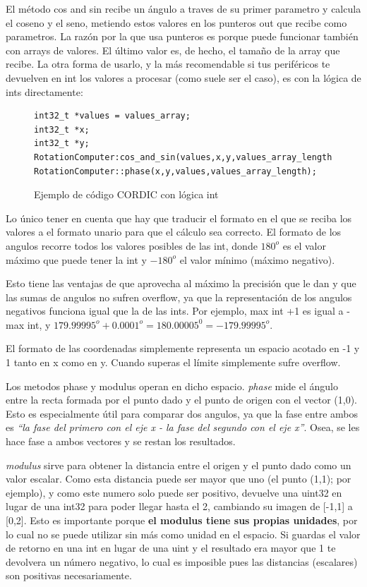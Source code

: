 \documentclass{report}
\begin{document}
\par \vspace{0.3cm}
El método cos and sin recibe un ángulo a traves de su primer parametro y calcula el coseno y el seno, metiendo estos valores en los punteros out que recibe como parametros. La razón por la que usa punteros es porque puede funcionar también con arrays de valores. El último valor es, de hecho, el tamaño de la array que recibe. La otra forma de usarlo, y la más recomendable si tus periféricos te devuelven en int los valores a procesar (como suele ser el caso), es con la lógica de ints directamente:
\begin{figure}[h]
\begin{lstlisting}
int32_t *values = values_array;
int32_t *x;
int32_t *y;
RotationComputer:cos_and_sin(values,x,y,values_array_length);
RotationComputer::phase(x,y,values,values_array_length);
\end{lstlisting}
\caption{Ejemplo de código CORDIC con lógica int}
  \label{CORDICwIntcode}
\end{figure}
\par \vspace{0.3cm}
Lo único tener en cuenta que hay que traducir el formato en el que se reciba los valores a el formato unario para que el cálculo sea correcto. El formato de los angulos recorre todos los valores posibles de las int, donde $180^o$ es el valor máximo que puede tener la int y $-180^o$ el valor mínimo (máximo negativo). \par
Esto tiene las ventajas de que aprovecha al máximo la precisión que le dan y que las sumas de angulos no sufren overflow, ya que la representación de los angulos negativos funciona igual que la de las ints. Por ejemplo, max int +1 es igual a -max int, y $179.99995^o + 0.0001^o = 180.00005^0 = -179.99995^o$. \par
El formato de las coordenadas simplemente representa un espacio acotado en -1 y 1 tanto en x como en y. Cuando superas el límite simplemente sufre overflow. \par \vspace{0.3cm}
Los metodos phase y modulus operan en dicho espacio. \textit{phase} mide el ángulo entre la recta formada por el punto dado y el punto de origen con el vector (1,0). Esto es especialmente útil para comparar dos angulos, ya que la fase entre ambos es \textit{``la fase del primero con el eje x - la fase del segundo con el eje x''}. Osea, se les hace fase a ambos vectores y se restan los resultados. \par
\textit{modulus} sirve para obtener la distancia entre el origen y el punto dado como un valor escalar. Como esta distancia puede ser mayor que uno (el punto (1,1); por ejemplo), y como este numero solo puede ser positivo, devuelve una uint32 en lugar de una int32 para poder llegar hasta el 2, cambiando su imagen de [-1,1] a [0,2]. Esto es importante porque \textbf{el modulus tiene sus propias unidades}, por lo cual no se puede utilizar sin más como unidad en el espacio. Si guardas el valor de retorno en una int en lugar de una uint y el resultado era mayor que 1 te devolvera un número negativo, lo cual es imposible pues las distancias (escalares) son positivas necesariamente. 
\end{document}
